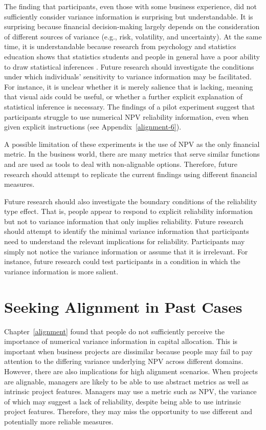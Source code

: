 \documentclass[a4paper, nobind]{templates/ociamthesis}
\theoremstyle{definition}
\theoremstyle{definition}
\theoremstyle{definition}
\theoremstyle{definition}
\theoremstyle{remark}
\begin{document}
The finding that participants, even those with some business experience, did not
sufficiently consider variance information is surprising but understandable. It
is surprising because financial decision-making largely depends on the
consideration of different sources of variance (e.g., risk, volatility, and
uncertainty). At the same time, it is understandable because research from
psychology and statistics education shows that statistics students and people in
general have a poor ability to draw statistical inferences \autocites[e.g.,][]{galesic2010,konold1993}. Future research should investigate the conditions under which
individuals' sensitivity to variance information may be facilitated. For
instance, it is unclear whether it is merely salience that is lacking, meaning
that visual aids could be useful, or whether a further explicit explanation of
statistical inference is necessary. The findings of a pilot experiment suggest
that participants struggle to use numerical NPV reliability information, even
when given explicit instructions (see Appendix~\ref{alignment-6}).

A possible limitation of these experiments is the use of NPV as the only
financial metric. In the business world, there are many metrics that serve
similar functions and are used as tools to deal with non-alignable options.
Therefore, future research should attempt to replicate the current findings
using different financial measures.

Future research should also investigate the boundary conditions of the
reliability type effect. That is, people appear to respond to explicit
reliability information but not to variance information that only implies
reliability. Future research should attempt to identify the minimal variance
information that participants need to understand the relevant implications for
reliability. Participants may simply not notice the variance information or
assume that it is irrelevant. For instance, future research could test
participants in a condition in which the variance information is more salient.

\newpage

\printbibliography[segment=\therefsegment,heading=subbibintoc]

\hypertarget{interstitial-2}{%
\chapter{Seeking Alignment in Past Cases}\label{interstitial-2}}

Chapter~\ref{alignment} found that people do not sufficiently perceive the
importance of numerical variance information in capital allocation. This is
important when business projects are dissimilar because people may fail to pay
attention to the differing variance underlying NPV across different domains.
However, there are also implications for high alignment scenarios. When projects
are alignable, managers are likely to be able to use abstract metrics as well as
intrinsic project features. Managers may use a metric such as NPV, the variance
of which may suggest a lack of reliability, despite being able to use intrinsic
project features. Therefore, they may miss the opportunity to use different and
potentially more reliable measures.
\end{document}
